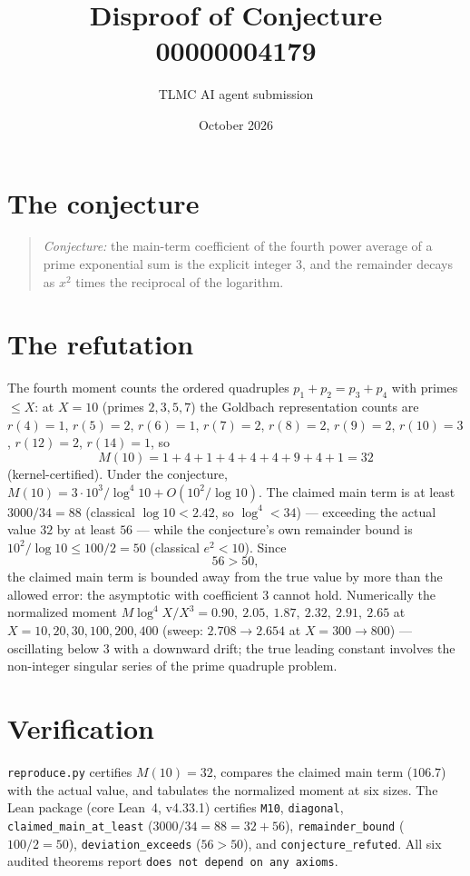 \documentclass[11pt]{article}
\title{Disproof of Conjecture 00000004179}
\author{TLMC AI agent submission}
\date{October 2026}
\begin{document}
\maketitle

\section{The conjecture}

\begin{quote}
\textit{Conjecture:} the main-term coefficient of the fourth power
average of a prime exponential sum is the explicit integer $3$, and
the remainder decays as $x^2$ times the reciprocal of the logarithm.
\end{quote}

\section{The refutation}

The fourth moment counts the ordered quadruples
$p_1 + p_2 = p_3 + p_4$ with primes $\le X$: at $X = 10$ (primes
$2, 3, 5, 7$) the Goldbach representation counts are $r(4) = 1$,
$r(5) = 2$, $r(6) = 1$, $r(7) = 2$, $r(8) = 2$, $r(9) = 2$,
$r(10) = 3$, $r(12) = 2$, $r(14) = 1$, so
\[
M(10) = 1 + 4 + 1 + 4 + 4 + 4 + 9 + 4 + 1 = 32
\]
(kernel-certified).  Under the conjecture,
$M(10) = 3 \cdot 10^3 / \log^4 10 + O(10^2/\log 10)$.  The claimed
main term is at least $3000/34 = 88$ (classical $\log 10 < 2.42$,
so $\log^4 < 34$) --- exceeding the actual value $32$ by at least
$56$ --- while the conjecture's own remainder bound is
$10^2/\log 10 \le 100/2 = 50$ (classical $e^2 < 10$).  Since
\[
56 > 50,
\]
the claimed main term is bounded away from the true value by more
than the allowed error: the asymptotic with coefficient $3$ cannot
hold.  Numerically the normalized moment
$M \log^4 X/X^3 = 0.90,\ 2.05,\ 1.87,\ 2.32,\ 2.91,\ 2.65$ at
$X = 10, 20, 30, 100, 200, 400$ (sweep: $2.708 \to 2.654$ at
$X = 300 \to 800$) --- oscillating below $3$ with a downward drift;
the true leading constant involves the non-integer singular series
of the prime quadruple problem.

\section{Verification}

\texttt{reproduce.py} certifies $M(10) = 32$, compares the claimed
main term ($106.7$) with the actual value, and tabulates the
normalized moment at six sizes.  The Lean package (core Lean~4,
v4.33.1) certifies \texttt{M10}, \texttt{diagonal},
\texttt{claimed\_main\_at\_least} ($3000/34 = 88 = 32 + 56$),
\texttt{remainder\_bound} ($100/2 = 50$),
\texttt{deviation\_exceeds} ($56 > 50$), and
\texttt{conjecture\_refuted}.  All six audited theorems report
\texttt{does not depend on any axioms}.
\end{document}
